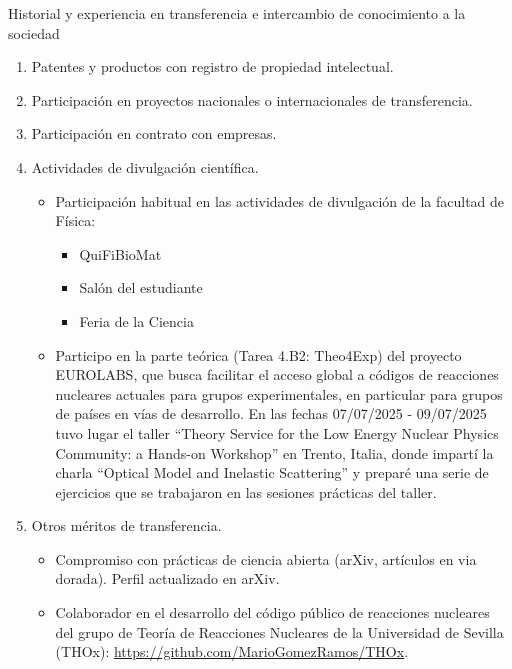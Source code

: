 \documentclass{resume2} %
\begin{document}
\begin{rSection}{Historial y experiencia en transferencia e intercambio de conocimiento a la sociedad}

\begin{enumerate}[label=\alph*.]

\item  Patentes y productos con registro de propiedad intelectual.

\item Participación en proyectos nacionales o internacionales de transferencia.

\item Participación en contrato con empresas.

\item Actividades de divulgación científica.

\begin{itemize}
\item Participaci\'on habitual en las actividades de divulgaci\'on de la facultad de F\'isica:
\begin{itemize}
\item QuiFiBioMat
\item Sal\'on del estudiante
\item Feria de la Ciencia
\end{itemize}


\item Participo en la parte te\'orica (Tarea 4.B2: Theo4Exp) del proyecto EUROLABS, que busca facilitar el acceso global a c\'odigos de reacciones nucleares actuales para grupos experimentales, en particular para grupos de pa\'ises en v\'ias de desarrollo. En las fechas 07/07/2025 - 09/07/2025 tuvo lugar el taller ``Theory Service for the Low Energy Nuclear Physics Community: a Hands-on Workshop'' en Trento, Italia, donde impart\'i la charla ``Optical Model and Inelastic Scattering'' y prepar\'e una serie de ejercicios que se trabajaron en las sesiones pr\'acticas del taller.

\end{itemize}

\item Otros méritos de transferencia.

\begin{itemize}
\item Compromiso con pr\'acticas de ciencia abierta (arXiv, art\'iculos en via dorada). Perfil actualizado en arXiv.
\item Colaborador en el desarrollo del c\'odigo p\'ublico de reacciones nucleares del grupo de Teor\'ia de Reacciones Nucleares de la Universidad de Sevilla (THOx): \url{https://github.com/MarioGomezRamos/THOx}.
\end{itemize}

\end{enumerate}
\end{rSection}
\end{document}
